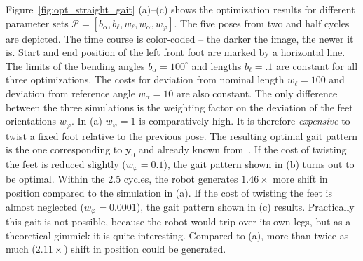 \documentclass[letterpaper,10pt,conference]{ieeeconf}  %
\begin{document}
Figure~\ref{fig:opt_straight_gait} (a)--(c) shows the optimization results for different parameter sets $\mathcal{P} = [b_\alpha, b_\ell, w_\ell, w_\alpha, w_\varphi]$.
The five poses from two and half cycles are depicted.
The time course is color-coded -- the darker the image, the newer it is.
Start and end position of the left front foot are marked by a horizontal line.
The limits of the bending angles $b_{\alpha} = 100^\circ$ and lengths $b_{\ell}=.1$ are constant for all three optimizations.
The costs for deviation from nominal length $w_\ell = 100$ and deviation from reference angle $w_\alpha=10$ are also constant.
The only difference between the three simulations is the weighting factor on the deviation of the feet orientations $w_\varphi$.
In (a) $w_\varphi=1$ is comparatively high. 
It is therefore \textsl{expensive} to twist a fixed foot relative to the previous pose.
The resulting optimal gait pattern is the one corresponding to $\bm{y}_0$ and already known from~\cite{PA_Schiller}.
If the cost of twisting the feet is reduced slightly ($w_\varphi=0.1$), the gait pattern shown in (b) turns out to be optimal.
Within the 2.5 cycles, the robot generates $1.46 \times$ more shift in position compared to the simulation in (a).
If the cost of twisting the feet is almost neglected ($w_\varphi=0.0001$), the gait pattern shown in (c) results.
Practically this gait is not possible, because the robot would trip over its own legs, but as a theoretical gimmick it is quite interesting.
Compared to (a), more than twice as much ($2.11 \times$) shift in position could be generated.
\end{document}
